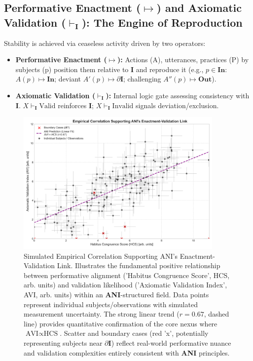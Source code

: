 \documentclass{article}
\newcommand{\ANI}{\textbf{ANI}}             %
\newcommand{\Isness}{\mathbf{I}}            %
\newcommand{\Inness}{\mathbf{In}}           %
\newcommand{\Outness}{\mathbf{Out}}         %
\newcommand{\enactment}{\ensuremath{\mapsto}} %
\newcommand{\validates}[1]{\ensuremath{\vdash_{#1}}} %
\newcommand{\boundary}[1]{\ensuremath{\partial #1}} %
\begin{document}
\subsection{Performative Enactment ($\enactment$) and Axiomatic Validation ($\validates{\Isness}$): The Engine of Reproduction}

Stability is achieved via ceaseless activity \citep{Goffman1959} driven by two operators:
\begin{itemize}
    \item \textbf{Performative Enactment ($\enactment$):} Actions (A), utterances, practices (P) by subjects (p) position them relative to $\Isness$ and reproduce it (e.g., $p \in \Inness$: $A(p) \enactment \Inness$; deviant $A'(p) \enactment \boundary{\Isness}$; challenging $A''(p) \enactment \Outness$).
    \item \textbf{Axiomatic Validation ($\validates{\Isness}$):} Internal logic gate assessing consistency with $\Isness$. $X \validates{\Isness} \text{Valid}$ reinforces $\Isness$; $X \validates{\Isness} \text{Invalid}$ signals deviation/exclusion.
\end{itemize}

\begin{figure}[h!]
    \centering
    \includegraphics[width=0.9\textwidth]{figures/ani_figure3_correlation_inspired.png}
    \caption{Simulated Empirical Correlation Supporting ANI's Enactment-Validation Link. Illustrates the fundamental positive relationship between performative alignment ('Habitus Congruence Score', HCS, arb. units) and validation likelihood ('Axiomatic Validation Index', AVI, arb. units) within an \ANI{}-structured field. Data points represent individual subjects/observations with simulated measurement uncertainty. The strong linear trend (\(r=0.67\), dashed line) provides quantitative confirmation of the core nexus where \( \text{AVI} \propto \text{HCS} \). Scatter and boundary cases (red 'x', potentially representing subjects near $\boundary{\Isness}$) reflect real-world performative nuance and validation complexities entirely consistent with \ANI{} principles.}
    \label{fig:correlation}
\end{figure}
\end{document}
